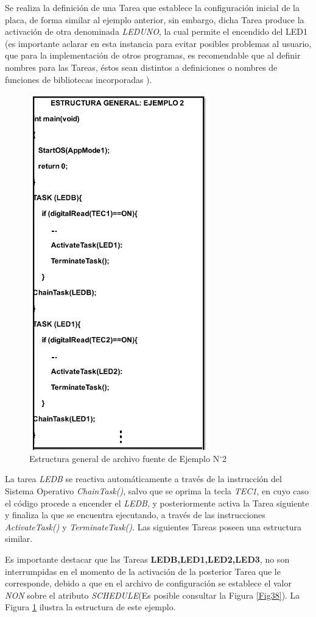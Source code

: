 \documentclass[12pt,letterpaper]{article}
\begin{document}
Se realiza la definición de una Tarea que establece la configuración inicial de la placa, de forma similar al ejemplo anterior, sin embargo, dicha Tarea produce la activación de otra denominada \textit{LEDUNO}, la cual permite el encendido del LED1 (es importante aclarar en esta instancia para evitar posibles problemas al usuario, que para la implementación de otros programas, es recomendable que al definir nombres para las Tareas, éstos sean distintos a definiciones o nombres de funciones de bibliotecas incorporadas ).
\begin{figure}[!h]
\centering
\includegraphics[width=5 cm]{figuras/f23.png}
\caption{Estructura general de archivo fuente de Ejemplo N$^{\circ}$2}
\label{Fig40}
\end{figure}
La tarea \textit{LEDB} se reactiva automáticamente a través de la instrucción del Sistema Operativo \textit{ChainTask()}, salvo que se oprima la tecla \textit{TEC1}, en cuyo caso el código procede a encender el \textit{LEDB}, y posteriormente activa la Tarea siguiente y finaliza la que se encuentra ejecutando, a través de las instrucciones \textit{ActivateTask()} y \textit{TerminateTask()}. Las siguientes Tareas poseen una estructura similar.

Es importante destacar que las Tareas \textbf{LEDB,LED1,LED2,LED3}, no son interrumpidas  en el momento de la activación de la posterior Tarea que le corresponde, debido a que en el archivo de configuración se establece el valor \textit{NON} sobre el atributo \textit{SCHEDULE}(Es posible consultar la Figura \ref{Fig38}). La Figura \ref{Fig40} ilustra la estructura de este ejemplo.
\end{document}
